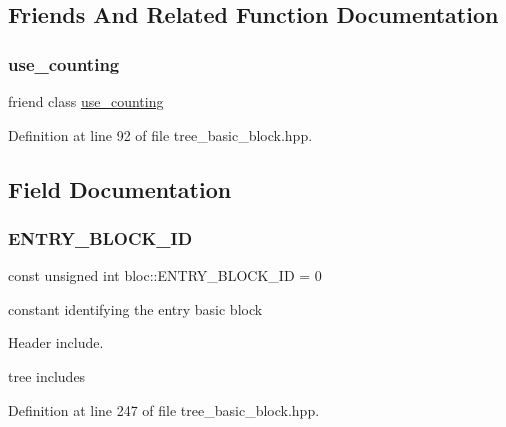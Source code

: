 \subsection{Friends And Related Function Documentation}
\mbox{\label{structbloc_a87cbb5973f5ed1249690157189f87ff5}} 
\subsubsection{\texorpdfstring{use\+\_\+counting}{use\_counting}}
{\footnotesize\ttfamily friend class \hyperlink{classuse__counting}{use\+\_\+counting}\hspace{0.3cm}{\ttfamily [friend]}}



Definition at line 92 of file tree\+\_\+basic\+\_\+block.\+hpp.



\subsection{Field Documentation}
\mbox{\label{structbloc_a008776f48d27c319d67b684055506087}} 
\subsubsection{\texorpdfstring{E\+N\+T\+R\+Y\+\_\+\+B\+L\+O\+C\+K\+\_\+\+ID}{ENTRY\_BLOCK\_ID}}
{\footnotesize\ttfamily const unsigned int bloc\+::\+E\+N\+T\+R\+Y\+\_\+\+B\+L\+O\+C\+K\+\_\+\+ID = 0\hspace{0.3cm}{\ttfamily [static]}}



constant identifying the entry basic block 

Header include.

tree includes 

Definition at line 247 of file tree\+\_\+basic\+\_\+block.\+hpp.



